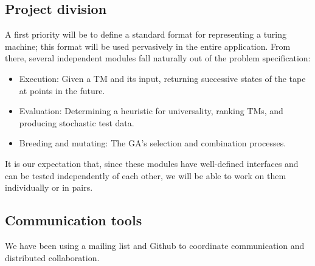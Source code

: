 \subsection{Project division}

A first priority will be to define a standard format for representing a turing machine; this format will be used pervasively in the entire application. From there, several independent modules fall naturally out of the problem specification:

\begin{itemize}
\item Execution: Given a TM and its input, returning successive states of the tape at points in the future.
\item Evaluation: Determining a heuristic for universality, ranking TMs, and producing stochastic test data.
\item Breeding and mutating: The GA's selection and combination processes.
\end{itemize}

It is our expectation that, since these modules have well-defined interfaces and can be tested independently of each other, we will be able to work on them individually or in pairs.

\subsection{Communication tools}

We have been using a mailing list and Github to coordinate communication and distributed collaboration.
